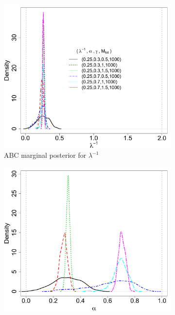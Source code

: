 \documentclass[ejs]{imsart}
\numberwithin{equation}{section}
\theoremstyle{plain}
\begin{document}
\begin{figure}[htbp]
   \centering
\begin{subfigure}{0.48\textwidth}
\centering
\includegraphics[width = \textwidth]{figures/marg_k.pdf} 
\caption{ABC marginal posterior for $\lambda^{-1}$}\label{subfig:marg_k}
\end{subfigure}
\begin{subfigure}{0.48\textwidth}
\centering
\includegraphics[width = \textwidth]{figures/marg_alpha.pdf} 

\end{subfigure}
\end{figure}
\end{document}
